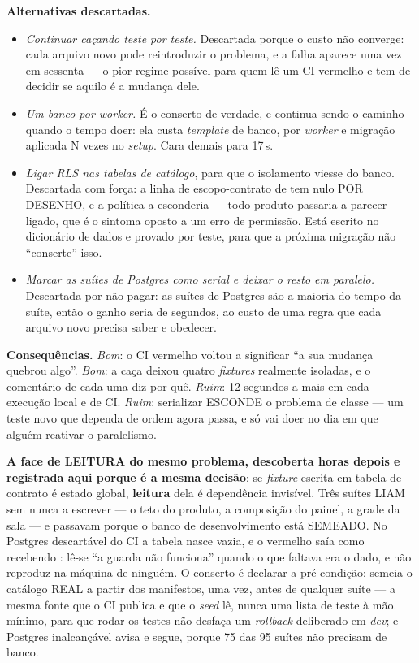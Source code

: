 \textbf{Alternativas descartadas.}
\begin{itemize}
  \item \emph{Continuar caçando teste por teste.} Descartada porque o custo não
    converge: cada arquivo novo pode reintroduzir o problema, e a falha aparece
    uma vez em sessenta --- o pior regime possível para quem lê um CI vermelho e
    tem de decidir se aquilo é a mudança dele.
  \item \emph{Um banco por \emph{worker}.} É o conserto de verdade, e continua
    sendo o caminho quando o tempo doer: ela custa \emph{template} de banco,
     por \emph{worker} e migração aplicada N vezes no
    \emph{setup}. Cara demais para 17\,s.
  \item \emph{Ligar RLS nas tabelas de catálogo}, para que o isolamento viesse do
    banco. Descartada com força: a linha de escopo-contrato de
     tem  nulo POR DESENHO, e a política a
    esconderia --- todo produto passaria a parecer ligado, que é o sintoma oposto
    a um erro de permissão. Está escrito no dicionário de dados e provado por
    teste, para que a próxima migração não \enquote{conserte} isso.
  \item \emph{Marcar as suítes de Postgres como serial e deixar o resto em
    paralelo.} Descartada por não pagar: as suítes de Postgres são a maioria do
    tempo da suíte, então o ganho seria de segundos, ao custo de uma regra que
    cada arquivo novo precisa saber e obedecer.
\end{itemize}

\textbf{Consequências.} \emph{Bom}: o CI vermelho voltou a significar
\enquote{a sua mudança quebrou algo}. \emph{Bom}: a caça deixou quatro
\emph{fixtures} realmente isoladas, e o comentário de cada uma diz por quê.
\emph{Ruim}: 12 segundos a mais em cada execução local e de CI. \emph{Ruim}:
serializar ESCONDE o problema de classe --- um teste novo que dependa de ordem
agora passa, e só vai doer no dia em que alguém reativar o paralelismo.

\textbf{A face de LEITURA do mesmo problema, descoberta horas depois e
registrada aqui porque é a mesma decisão}: se \emph{fixture} escrita em tabela
de contrato é estado global, \textbf{leitura} dela é dependência invisível. Três
suítes LIAM  sem nunca a escrever --- o teto do produto, a
composição do painel, a grade da sala --- e passavam porque o banco de
desenvolvimento está SEMEADO. No Postgres descartável do CI a tabela nasce
vazia, e o vermelho saía como 
recebendo : lê-se \enquote{a guarda não funciona} quando o que faltava
era o dado, e não reproduz na máquina de ninguém. O conserto é declarar a
pré-condição:  semeia o catálogo REAL a partir dos manifestos,
uma vez, antes de qualquer suíte --- a mesma fonte que o CI publica e que o
\emph{seed} lê, nunca uma lista de teste à mão.  mínimo, para que
rodar os testes não desfaça um \emph{rollback} deliberado em \emph{dev}; e
Postgres inalcançável avisa e segue, porque 75 das 95 suítes não precisam de
banco.

